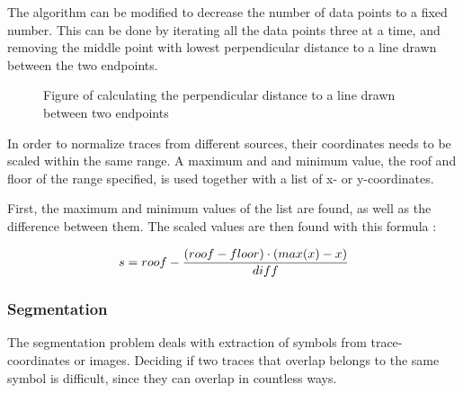 The algorithm can be modified to decrease the number of data points to a fixed number. This can be done by iterating all the data points three at a time, and removing the middle point with lowest perpendicular distance to a line drawn between the two endpoints.

\begin{figure}[H]
    \centering
    \caption{Figure of calculating the perpendicular distance to a line drawn between two endpoints}
    \label{fig:my_label}
\end{figure}
\label{ramer_douglas_peucker}

In order to normalize traces from different sources, their coordinates needs to be scaled within the same range. A maximum and and minimum value, the roof and floor of the range specified, is used together with a list of x- or y-coordinates.

First, the maximum and minimum values of the list are found, as well as the difference between them. The scaled values are then found with this formula \cite{perry_normalize_2013}:

\begin{equation} \label{eqn:scale_linear_by_column}
\centering
\begin{split}
    s = roof - \frac{(roof - floor) \cdot (max(x) - x)}{diff}
\end{split}
\end{equation}
\label{scale_linear_by_column}

\subsubsection{Segmentation} \label{Segmentation}

The segmentation problem deals with extraction of symbols from trace-coordinates or images. Deciding if two traces that overlap belongs to the same symbol is difficult, since they can overlap in countless ways. 

